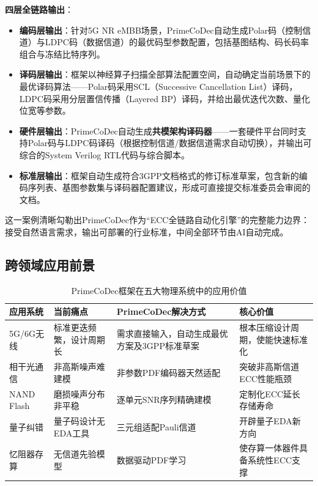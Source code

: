 \textbf{四层全链路输出}：
\begin{itemize}
  \item \textbf{编码层输出}：针对5G NR eMBB场景，PrimeCoDec自动生成Polar码（控制信道）与LDPC码（数据信道）的最优码型参数配置，包括基图结构、码长码率组合与冻结比特序列。
  \item \textbf{译码层输出}：框架以神经算子扫描全部算法配置空间，自动确定当前场景下的最优译码算法——Polar码采用SCL（Successive Cancellation List）译码，LDPC码采用分层置信传播（Layered BP）译码，并给出最优迭代次数、量化位宽等参数。
  \item \textbf{硬件层输出}：PrimeCoDec自动生成\textbf{共模架构译码器}——一套硬件平台同时支持Polar码与LDPC码译码（根据控制信道/数据信道需求自动切换），并输出可综合的System Verilog RTL代码与综合脚本。
  \item \textbf{标准层输出}：框架自动生成符合3GPP文档格式的修订标准草案，包含新的编码序列表、基图参数集与译码器配置建议，形成可直接提交标准委员会审阅的文档。
\end{itemize}

这一案例清晰勾勒出PrimeCoDec作为``ECC全链路自动化引擎''的完整能力边界：接受自然语言需求，输出可部署的行业标准，中间全部环节由AI自动完成。

\subsection{跨领域应用前景}\label{sec:applications}

\begin{table}[htbp]
\centering
\caption{PrimeCoDec框架在五大物理系统中的应用价值}
\label{tab:applications}
\setlength{\tabcolsep}{4pt}
\begin{tabular}{@{}L{2.0cm}L{3.2cm}L{3.2cm}L{4.8cm}@{}}
\toprule
\textbf{应用系统} & \textbf{当前痛点} & \textbf{PrimeCoDec解决方式} & \textbf{核心价值} \\
\midrule
5G/6G无线 & 标准更迭频繁，设计周期长 & 需求直接输入，自动生成最优方案及3GPP标准草案 & 根本压缩设计周期，使能快速标准化 \\
相干光通信 & 非高斯噪声难建模 & 非参数PDF编码器天然适配 & 突破非高斯信道ECC性能瓶颈 \\
NAND Flash & 磨损噪声分布非平稳 & 逐单元SNR序列精确建模 & 定制化ECC延长存储寿命 \\
量子纠错 & 量子码设计无EDA工具 & 三元组适配Pauli信道 & 开辟量子EDA新方向 \\
忆阻器存算 & 无信道先验模型 & 数据驱动PDF学习 & 使存算一体器件具备系统性ECC支撑 \\
\bottomrule
\end{tabular}
\end{table}

